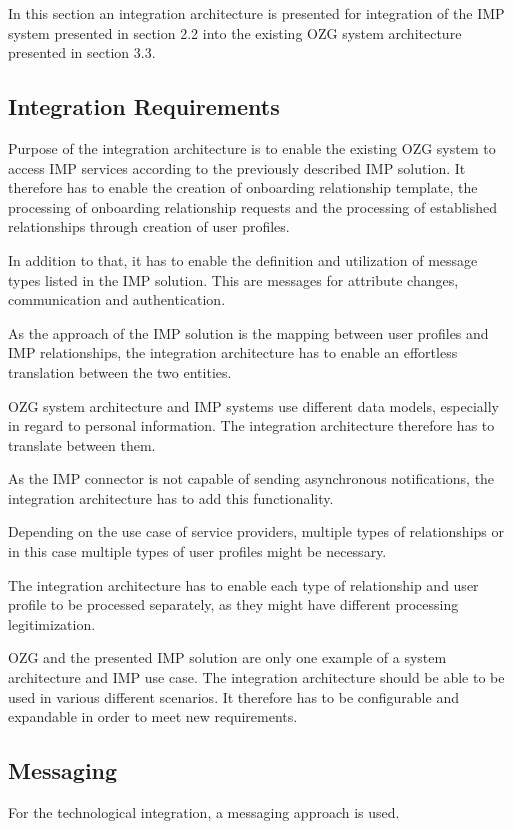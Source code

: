 In this section an integration architecture is presented for integration of the IMP system presented in section 2.2 into the existing OZG system architecture presented in section 3.3. 

\subsection{Integration Requirements}
Purpose of the integration architecture is to enable the existing OZG system to access IMP services according to the previously described IMP solution. It therefore has to enable the creation of onboarding relationship template, the processing of onboarding relationship requests and the processing of established relationships through creation of user profiles.

In addition to that, it has to enable the definition and utilization of message types listed in the IMP solution. This are messages for attribute changes, communication and authentication.

As the approach of the IMP solution is the mapping between user profiles and IMP relationships, the integration architecture has to enable an effortless translation between the two entities.

OZG system architecture and IMP systems use different data models, especially in regard to personal information. The integration architecture therefore has to translate between them.

As the IMP connector is not capable of sending asynchronous notifications, the integration architecture has to add this functionality.

Depending on the use case of service providers, multiple types of relationships or in this case multiple types of user profiles might be necessary.

The integration architecture has to enable each type of relationship and user profile to be processed separately, as they might have different processing legitimization.

OZG and the presented IMP solution are only one example of a system architecture and IMP use case. The integration architecture should be able to be used in various different scenarios. It therefore has to be configurable and expandable in order to meet new requirements.

\subsection{Messaging}
For the technological integration, a messaging approach is used. 

